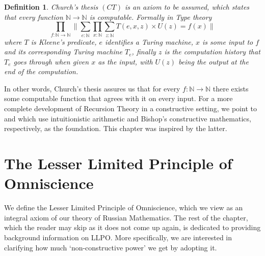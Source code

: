 \documentclass[12pt]{report}
\newtheorem{defn}[thm]{Definition}
\theoremstyle{definition}
\begin{document}
\begin{defn}\label{CT}
Church's thesis $(CT)$ is an axiom to be assumed, which states that every function $\mathbb{N}\rightarrow \mathbb{N}$ is computable. 
Formally in Type theory
$$\prod_{f : \mathbb{N}\rightarrow \mathbb{N}} \Big\lVert \sum_{e : \mathbb{N}} \prod_{x : \mathbb{N}} \sum_{z : \mathbb{N}} T(e,x,z) \times U(z) = f(x) \Big\rVert$$
where $T$ is Kleene's predicate, $e$ identifies a Turing machine, $x$ is some input to $f$ and its corresponding Turing machine $T_e$, finally $z$ is the computation history that $T_e$ goes through when given $x$ as the input, with $U(z)$ being the output at the end of the computation.
\end{defn}

In other words, Church's thesis assures us that for every $f : \mathbb{N} \rightarrow \mathbb{N}$ there exists some computable function that agrees with it on every input.
For a more complete development of Recursion Theory in a constructive setting, we point to \cite{recursionInHA} and \cite{bridges_richman_1987_1} which use intuitionistic arithmetic and Bishop's constructive mathematics, respectively, as the foundation. 
This chapter was inspired by the latter. 

\chapter{The Lesser Limited Principle of Omniscience}\label{ChapterLLPO}
We define the Lesser Limited Principle of Omniscience, which we view as an integral axiom of our theory of Russian Mathematics. 
The rest of the chapter, which the reader may skip as it does not come up again, is dedicated to providing background information on LLPO. 
More specifically, we are interested in clarifying how much `non-constructive power' we get by adopting it. 
\end{document}
